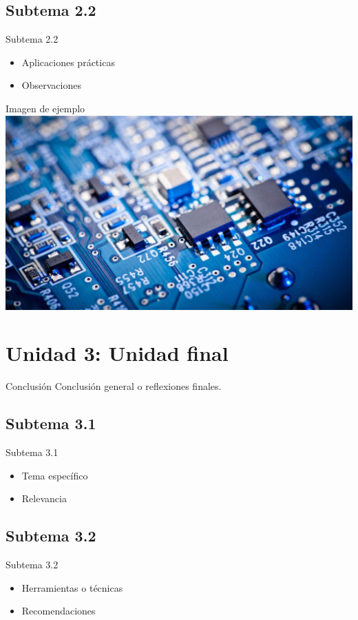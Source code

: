 \documentclass[aspectratio=169]{beamer}
\begin{document}
\subsection{Subtema 2.2}
\begin{frame}{Subtema 2.2}
  \begin{itemize}
    \item Aplicaciones prácticas
    \item Observaciones
  \end{itemize}
\end{frame}

\begin{frame}{Imagen de ejemplo}
  \includegraphics[width=0.8\linewidth]{Images/example-image}
\end{frame}

\section{Unidad 3: Unidad final}
\begin{frame}{Conclusión}
  Conclusión general o reflexiones finales.
\end{frame}

\subsection{Subtema 3.1}
\begin{frame}{Subtema 3.1}
  \begin{itemize}
    \item Tema específico
    \item Relevancia
  \end{itemize}
\end{frame}

\subsection{Subtema 3.2}
\begin{frame}{Subtema 3.2}
  \begin{itemize}
    \item Herramientas o técnicas
    \item Recomendaciones
  \end{itemize}
\end{frame}
\end{document}
